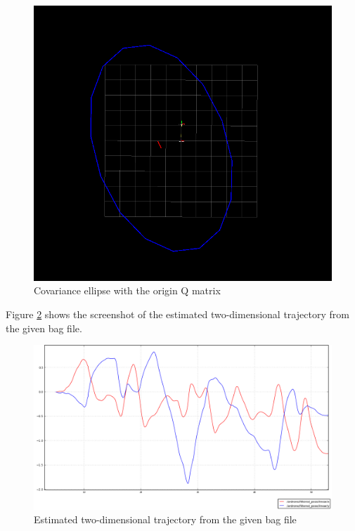 \documentclass[14pt,a4paper]{article}
\begin{document}
	\begin{figure}[htbp]
	\centering
	\includegraphics[scale=0.5]{Q_origin.png}
  	\caption{Covariance ellipse with the origin Q matrix}
    \label{graph:Q_origin}
	\end{figure}
	
	Figure \ref{graph:filtered_pose} shows the screenshot of the estimated two-dimensional trajectory from the given bag file.
	
	\begin{figure}[htbp]
	\centering
	\includegraphics[scale=0.4]{filtered_pose.png}
  	\caption{Estimated two-dimensional trajectory from the given bag file}
    \label{graph:filtered_pose}
	\end{figure}
	
\end{document}
